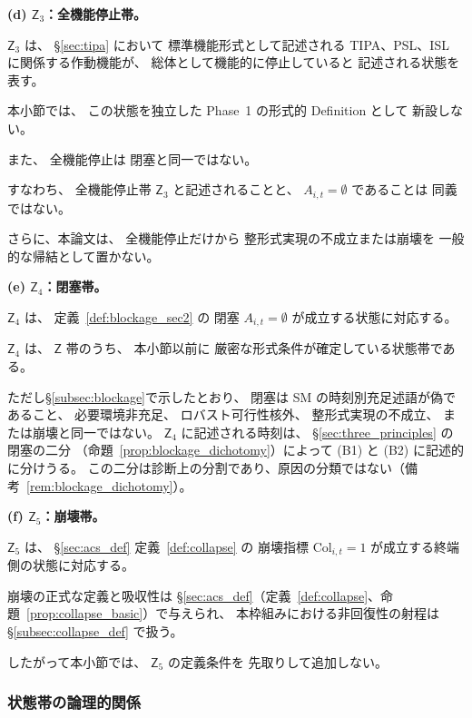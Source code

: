 \begin{remark}[閉塞・崩壊周辺の記述的状態帯]
\medskip
\noindent
\textbf{(d) $\mathsf{Z}_3$：全機能停止帯。}

$\mathsf{Z}_3$ は、
\S\ref{sec:tipa} において
標準機能形式として記述される
TIPA、PSL、ISL に関係する作動機能が、
総体として機能的に停止していると
記述される状態を表す。

本小節では、
この状態を独立した
Phase~1 の形式的 Definition として
新設しない。

また、
全機能停止は
閉塞と同一ではない。

すなわち、
全機能停止帯 $\mathsf{Z}_3$ と記述されることと、
$A_{i,t}=\emptyset$ であることは
同義ではない。

さらに、本論文は、
全機能停止だけから
整形式実現の不成立または崩壊を
一般的な帰結として置かない。

\medskip
\noindent
\textbf{(e) $\mathsf{Z}_4$：閉塞帯。}

$\mathsf{Z}_4$ は、
定義~\ref{def:blockage_sec2} の
閉塞
$A_{i,t}=\emptyset$
が成立する状態に対応する。

$\mathsf{Z}_4$ は、
$\mathsf{Z}$ 帯のうち、
本小節以前に
厳密な形式条件が確定している状態帯である。

ただし\S\ref{subsec:blockage}で示したとおり、
閉塞は
SM の時刻別充足述語が偽であること、
必要環境非充足、
ロバスト可行性核外、
整形式実現の不成立、
または崩壊と同一ではない。
$\mathsf{Z}_4$ に記述される時刻は、
\S\ref{sec:three_principles} の閉塞の二分
（命題~\ref{prop:blockage_dichotomy}）によって
(B1) と (B2) に記述的に分けうる。
この二分は診断上の分割であり、原因の分類ではない（備考~\ref{rem:blockage_dichotomy}）。

\medskip
\noindent
\textbf{(f) $\mathsf{Z}_5$：崩壊帯。}

$\mathsf{Z}_5$ は、
\S\ref{sec:acs_def} 定義~\ref{def:collapse} の
崩壊指標
$\mathrm{Col}_{i,t}=1$
が成立する終端側の状態に対応する。

崩壊の正式な定義と吸収性は
\S\ref{sec:acs_def}（定義~\ref{def:collapse}、命題~\ref{prop:collapse_basic}）で与えられ、
本枠組みにおける非回復性の射程は
\S\ref{subsec:collapse_def}
で扱う。

したがって本小節では、
$\mathsf{Z}_5$ の定義条件を
先取りして追加しない。
\end{remark}

\subsubsection{状態帯の論理的関係}

